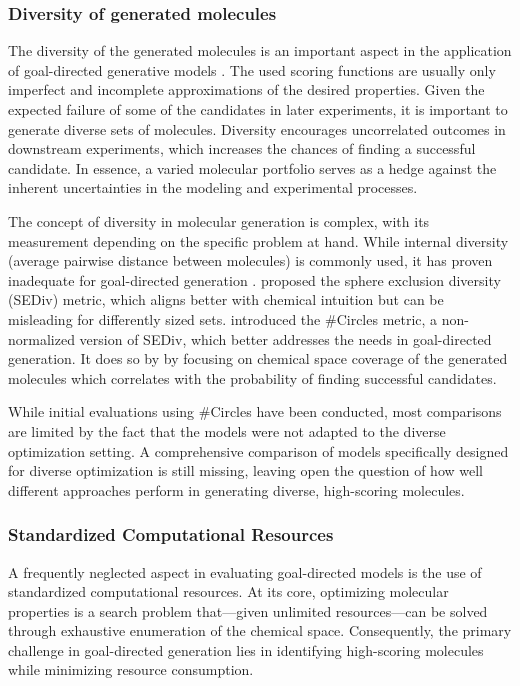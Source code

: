 \subsubsection{Diversity of generated molecules}
The diversity of the generated molecules is an important aspect in the application of goal-directed
generative models
\citep{martinDiverseViewpointsComputational2001,gorseDiversityMedicinalChemistry2006}. The used
scoring functions are usually only imperfect and incomplete approximations of the desired
properties. Given the expected failure of some of the candidates in later experiments, it is
important to generate diverse sets of molecules. Diversity encourages uncorrelated outcomes in
downstream experiments, which increases the chances of finding a successful candidate. In essence, a
varied molecular portfolio serves as a hedge against the inherent uncertainties in the modeling and
experimental processes.

The concept of diversity in molecular generation is complex, with its measurement depending on the
specific problem at hand. While internal diversity (average pairwise distance between molecules) is
commonly used, it has proven inadequate for goal-directed generation
\citep{waldmanNovelAlgorithmsOptimization2000,xieMARSMarkovMolecular2021,thomasComparisonStructureLigandbased2021}.
\citet{thomasComparisonStructureLigandbased2021} proposed the sphere exclusion diversity (SEDiv)
metric, which aligns better with chemical intuition but can be misleading for differently sized
sets. \citet{xieHowMuchSpace2023} introduced the \#Circles metric, a non-normalized version of SEDiv,
which better addresses the needs in goal-directed generation. It does so by
by focusing on chemical space coverage of the generated molecules which correlates with
the probability of finding successful candidates.

While initial evaluations using \#Circles have been conducted, most comparisons are limited by the
fact that the models were not adapted to the diverse optimization setting. A comprehensive
comparison of models specifically designed for diverse optimization is still missing, leaving open
the question of how well different approaches perform in generating diverse, high-scoring molecules.

\subsubsection{Standardized Computational Resources}
A frequently neglected aspect in evaluating goal-directed models is the use of standardized
computational resources. At its core, optimizing molecular properties is a search problem
that—given unlimited resources—can be solved through exhaustive enumeration of the chemical space.
Consequently, the primary challenge in goal-directed generation lies in identifying high-scoring molecules
while minimizing resource consumption.

